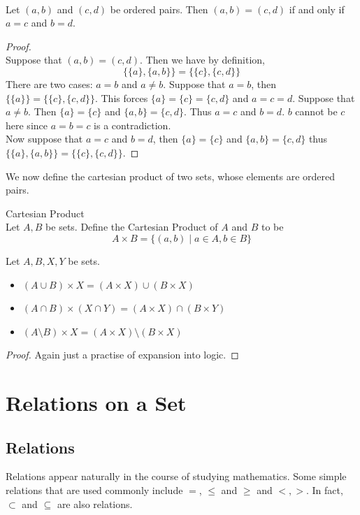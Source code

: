 \documentclass[a4paper]{article}
\begin{document}
\begin{prp}{}{}\\
Let $(a,b)$ and $(c,d)$ be ordered pairs. Then $(a,b)=(c,d)$ if and only if $a=c$ and $b=d$. 
\begin{proof}\\
Suppose that $(a,b)=(c,d)$. Then we have by definition, $$\{\{a\},\{a,b\}\}=\{\{c\},\{c,d\}\}$$ There are two cases: $a=b$ and $a\neq b$. Suppose that $a=b$, then $\{\{a\}\}=\{\{c\},\{c,d\}\}$. This forces $\{a\}=\{c\}=\{c,d\}$ and $a=c=d$. Suppose that $a\neq b$. Then $\{a\}=\{c\}$ and $\{a,b\}=\{c,d\}$. Thus $a=c$ and $b=d$. $b$ cannot be $c$ here since $a=b=c$ is a contradiction. \\

Now suppose that $a=c$ and $b=d$, then $\{a\}=\{c\}$ and $\{a,b\}=\{c,d\}$ thus $\{\{a\},\{a,b\}\}=\{\{c\},\{c,d\}\}$. 
\end{proof}
\end{prp}

We now define the cartesian product of two sets, whose elements are ordered pairs. 

\begin{defn}{Cartesian Product}{}\\
Let $A,B$ be sets. Define the Cartesian Product of $A$ and $B$ to be $$A\times B=\{(a,b)\;|\;a\in A, b\in B\}$$
\end{defn}

\begin{prp}{}{} Let $A,B,X,Y$ be sets. 
\begin{itemize}
\item $(A\cup B)\times X=(A\times X)\cup(B\times X)$
\item $(A\cap B)\times (X\cap Y)=(A\times X)\cap(B\times Y)$
\item $(A\setminus B)\times X=(A\times X)\setminus(B\times X)$
\end{itemize}
\begin{proof} Again just a practise of expansion into logic. 
\end{proof}
\end{prp}

\pagebreak
\section{Relations on a Set}
\subsection{Relations}
Relations appear naturally in the course of studying mathematics. Some simple relations that are used commonly include $=$, $\leq$ and $\geq$ and $<,>$. In fact, $\subset$ and $\subseteq$ are also relations. 
\end{document}
